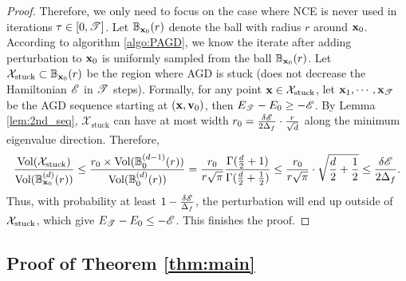 \begin{proof}
Therefore, we only need to focus on the case where NCE is never used in 
iterations $\tau \in [0, \mathscr{T}]$.
Let $\mathbb{B}_{\mathbf{x}_0}(r)$ denote the ball with radius $r$ around $\mathbf{x}_0$. According to algorithm \ref{algo:PAGD}, we know the iterate after adding perturbation to $\mathbf{x}_0$ is uniformly sampled from the ball $\mathbb{B}_{\mathbf{x}_0}(r)$. Let $\mathcal{X}_{\text{stuck}} \subset \mathbb{B}_{\mathbf{x}_0}(r)$ be the region where AGD is stuck (does not decrease the
Hamiltonian $\mathscr{E}$ in $\mathscr{T}$ steps).
Formally, for any point $\mathbf{x} \in \mathcal{X}_{\text{stuck}}$, let $\mathbf{x}_1, \cdots, \mathbf{x}_{\mathscr{T}}$ be the AGD sequence starting at $(\mathbf{x}, \mathbf{v}_0)$, then $E_{\mathscr{T}} - E_0 \ge -\mathscr{E}$. By Lemma \ref{lem:2nd_seq}, $\mathcal{X}_{\text{stuck}}$ can have at most width 
$r_0 = \frac{\delta\mathscr{E} }{2\Delta_f}\cdot\frac{r}{\sqrt{d}}$ along the
minimum eigenvalue direction. Therefore,
\begin{align*}
\frac{\text{Vol}(\mathcal{X}_{\text{stuck}})}{\text{Vol}(\mathbb{B}^{(d)}_{\mathbf{x}_0}(r))}
\le \frac{r_0 \times \text{Vol}(\mathbb{B}^{(d-1)}_0(r))}{\text{Vo{}l} (\mathbb{B}^{(d)}_0(r))}
= \frac{r_0}{r\sqrt{\pi}}\frac{\Gamma(\frac{d}{2}+1)}{\Gamma(\frac{d}{2}+\frac{1}{2})}
\le \frac{r_0}{r\sqrt{\pi}} \cdot \sqrt{\frac{d}{2}+\frac{1}{2}} \le \frac{\delta\mathscr{E} }{2\Delta_f}.
\end{align*}
Thus, with probability at least $1-\frac{\delta\mathscr{E} }{\Delta_f}$, the
perturbation will end up outside of $\mathcal{X}_{\text{stuck}}$, which give $E_{\mathscr{T}} - E_0\le -\mathscr{E}$. 
This finishes the proof.


\end{proof}

\subsection{Proof of Theorem \ref{thm:main}}

